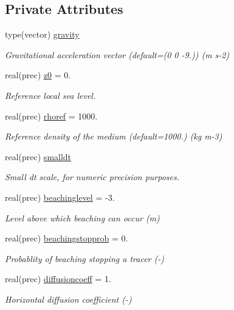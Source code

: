 \subsection*{Private Attributes}
\begin{DoxyCompactItemize}
\item 
type(vector) \mbox{\hyperlink{structsimulationglobals__mod_1_1constants__t_abe210fea4268af42f1cb950a1e3b3cfd}{gravity}}
\begin{DoxyCompactList}\small\item\em Gravitational acceleration vector (default=(0 0 -\/9.)) (m s-\/2) \end{DoxyCompactList}\item 
real(prec) \mbox{\hyperlink{structsimulationglobals__mod_1_1constants__t_a9dab4143c1d5fd54c8337d78ea9b7d82}{z0}} = 0.
\begin{DoxyCompactList}\small\item\em Reference local sea level. \end{DoxyCompactList}\item 
real(prec) \mbox{\hyperlink{structsimulationglobals__mod_1_1constants__t_ac95f74b07cc46e86d443d4dd666235c3}{rhoref}} = 1000.
\begin{DoxyCompactList}\small\item\em Reference density of the medium (default=1000.) (kg m-\/3) \end{DoxyCompactList}\item 
real(prec) \mbox{\hyperlink{structsimulationglobals__mod_1_1constants__t_a4e417855b60f5eb0f45d3094495f532b}{smalldt}}
\begin{DoxyCompactList}\small\item\em Small dt scale, for numeric precision purposes. \end{DoxyCompactList}\item 
real(prec) \mbox{\hyperlink{structsimulationglobals__mod_1_1constants__t_a735a778cb615271495fe8d5dc2b964b7}{beachinglevel}} = -\/3.
\begin{DoxyCompactList}\small\item\em Level above which beaching can occur (m) \end{DoxyCompactList}\item 
real(prec) \mbox{\hyperlink{structsimulationglobals__mod_1_1constants__t_a4f4f1254678f9c76367b50991561e9dd}{beachingstopprob}} = 0.
\begin{DoxyCompactList}\small\item\em Probablity of beaching stopping a tracer (-\/) \end{DoxyCompactList}\item 
real(prec) \mbox{\hyperlink{structsimulationglobals__mod_1_1constants__t_aa6904a27e36c7a47b9ea105741552025}{diffusioncoeff}} = 1.
\begin{DoxyCompactList}\small\item\em Horizontal diffusion coefficient (-\/) \end{DoxyCompactList}\end{DoxyCompactItemize}


